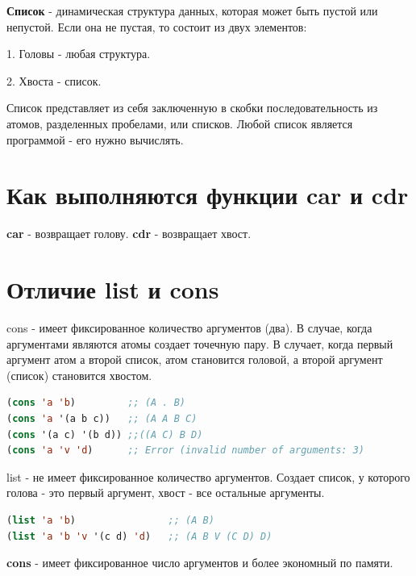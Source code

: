 \textbf{Список} - динамическая структура данных, которая может быть
пустой или непустой. Если она не пустая, то состоит из двух элементов:

1. Головы - любая структура.

2. Хвоста - список.

Список представляет из себя заключенную в скобки
последовательность из атомов, разделенных пробелами, или списков.
Любой список является программой - его нужно вычислять.

\section{Как выполняются функции car и cdr}

\textbf{car} - возвращает голову.
\textbf{cdr} - возвращает хвост.

\section{Отличие list и cons}

cons - имеет фиксированное количество аргументов (два). 
В случае, когда аргументами являются атомы создает точечную пару.
В случает, когда первый аргумент атом а второй список, атом становится головой,
а второй аргумент (список) становится хвостом. 
\begin{lstlisting}[language=Lisp]
(cons 'a 'b) 		 ;; (A . B)
(cons 'a '(a b c)) 	 ;; (A A B C)
(cons '(a c) '(b d)) ;;((A C) B D)
(cons 'a 'v 'd)  	 ;; Error (invalid number of arguments: 3)
\end{lstlisting}

\begin{figure}[ht!]
\end{figure}

list - не имеет фиксированное количество аргументов. 
Создает список, у которого голова - это первый аргумент,
хвост - все остальные аргументы.
\begin{lstlisting}[language=Lisp]
(list 'a 'b) 				;; (A B)
(list 'a 'b 'v '(c d) 'd) 	;; (A B V (C D) D)
\end{lstlisting}

\begin{figure}[ht!]
\end{figure}

\textbf{cons} - имеет фиксированное число аргументов и более экономный по памяти.

